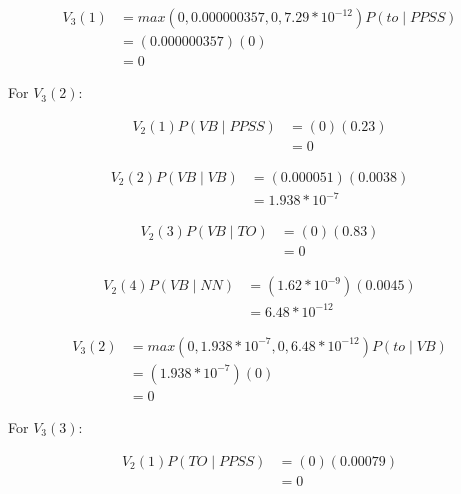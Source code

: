 \documentclass[10pt,a4paper]{article}
\begin{document}
\begin{equation}
\begin{split}
V_3(1) &= max(0,0.000000357,0,7.29*10^{-12})P(to\mid PPSS) \\
 &=(0.000000357)(0) \\
 &=0
\end{split}
\end{equation}

For $V_3(2):$

\begin{equation}
\begin{split}
V_2(1)P(VB\mid PPSS) &= (0)(0.23) \\
&= 0
\end{split}
\end{equation}

\begin{equation}
\begin{split}
V_2(2)P(VB\mid VB) &= (0.000051)(0.0038) \\
 &= 1.938*10^{-7}
\end{split}
\end{equation}

\begin{equation}
\begin{split}
V_2(3)P(VB\mid TO) &= (0)(0.83) \\
&= 0
\end{split}
\end{equation}

\begin{equation}
\begin{split}
V_2(4)P(VB\mid NN) &= (1.62*10^{-9})(0.0045) \\
 &= 6.48*10^{-12}
\end{split}
\end{equation}

\begin{equation}
\begin{split}
V_3(2) &= max(0,1.938*10^{-7},0,6.48*10^{-12})P(to\mid VB) \\
 &=(1.938*10^{-7})(0) \\
 &=0
\end{split}
\end{equation}

For $V_3(3):$

\begin{equation}
\begin{split}
V_2(1)P(TO\mid PPSS) &= (0)(0.00079) \\
&= 0
\end{split}
\end{equation}
\end{document}
